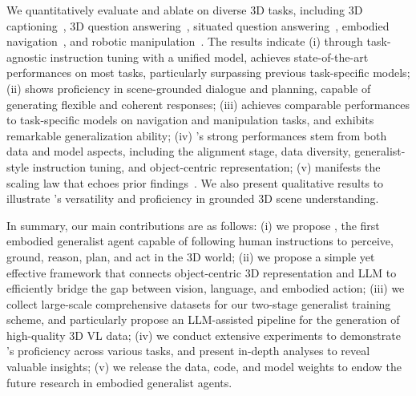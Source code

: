 \documentclass{article}
\begin{document}
We quantitatively evaluate and ablate \agent on diverse 3D tasks, including 3D captioning~\citep{chen2021scan2cap}, 3D question answering~\citep{azuma2022scanqa}, situated question answering~\citep{ma2023sqa3d}, embodied navigation~\citep{ramrakhya2022habitat}, and robotic manipulation~\citep{cliport}. The results indicate (i) through task-agnostic instruction tuning with a unified model, \agent achieves state-of-the-art performances on most tasks, particularly surpassing previous task-specific models; (ii) \agent shows proficiency in scene-grounded dialogue and planning, capable of generating flexible and coherent responses; (iii) \agent achieves comparable performances to \sota task-specific models on navigation and manipulation tasks, and exhibits remarkable generalization ability; (iv) \agent's strong performances stem from both data and model aspects, including the alignment stage, data diversity, generalist-style instruction tuning, and object-centric representation; (v) \agent manifests the scaling law that echoes prior findings~\citep{kaplan2020scaling,reed2022generalist,openai2023gpt4}. We also present qualitative results to illustrate \agent's versatility and proficiency in grounded 3D scene understanding.


In summary, our main contributions are as follows: (i) we propose \agent, the first embodied generalist agent capable of following human instructions to perceive, ground, reason, plan, and act in the 3D world; (ii) we propose a simple yet effective framework that connects object-centric 3D representation and LLM to efficiently bridge the gap between vision, language, and embodied action; (iii) we collect large-scale comprehensive datasets for our two-stage generalist training scheme, and particularly propose an LLM-assisted pipeline for the generation of high-quality 3D VL data; (iv) we conduct extensive experiments to demonstrate \agent's proficiency across various tasks, and present in-depth analyses to reveal valuable insights; (v) we release the data, code, and model weights to endow the future research in embodied generalist agents.
\end{document}
